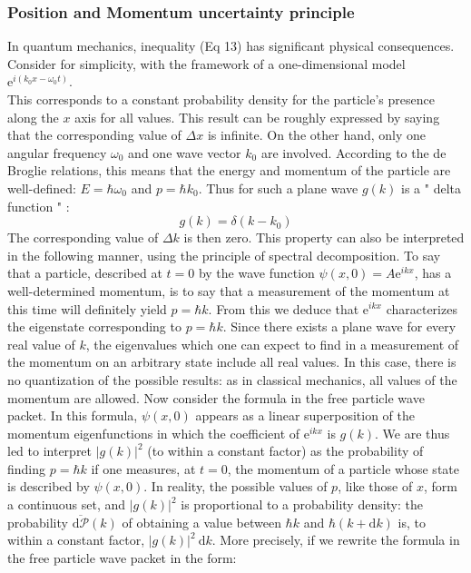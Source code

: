 \documentclass[%
 reprint,
 amsmath,amssymb,
 aps,
]{revtex4-2}
\begin{document}
\subsubsection{Position and Momentum uncertainty principle}
In quantum mechanics, inequality (Eq 13) has significant physical consequences. Consider for simplicity, with the framework of a one-dimensional model
$\mathrm{e}^{i\left(k_0 x-\omega_0 t\right)}$. \\
This corresponds to a constant probability density for the particle's presence along the $x$ axis for all values. This result can be roughly expressed by saying that the corresponding value of $\Delta x$ is infinite. On the other hand, only one angular frequency $\omega_0$ and one wave vector $k_0$ are involved. According to the de Broglie relations, this means that the energy and momentum of the particle are well-defined: $E=\hbar \omega_0$ and $p=\hbar k_0$. Thus for such a plane wave $g(k)$ is a " delta function " :
$$
g(k)=\delta\left(k-k_0\right)
$$
The corresponding value of $\Delta k$ is then zero.
This property can also be interpreted in the following manner, using the principle of spectral decomposition. To say that a particle, described at $t=0$ by the wave function $\psi(x, 0)=A \mathrm{e}^{i k x}$, has a well-determined momentum, is to say that a measurement of the momentum at this time will definitely yield $p=\hbar k$. From this we deduce that $\mathrm{e}^{i k x}$ characterizes the eigenstate corresponding to $p=\hbar k$. Since there exists a plane wave for every real value of $k$, the eigenvalues which one can expect to find in a measurement of the momentum on an arbitrary state include all real values. In this case, there is no quantization of the possible results: as in classical mechanics, all values of the momentum are allowed.
Now consider the formula in the free particle wave packet. In this formula, $\psi(x, 0)$ appears as a linear superposition of the momentum eigenfunctions in which the coefficient of $\mathrm{e}^{i k x}$ is $g(k)$. We are thus led to interpret $|g(k)|^2$ (to within a constant factor) as the probability of finding $p=\hbar k$ if one measures, at $t=0$, the momentum of a particle whose state is described by $\psi(x, 0)$. In reality, the possible values of $p$, like those of $x$, form a continuous set, and $|g(k)|^2$ is proportional to a probability density: the probability $\overline{\mathrm{d} \mathscr{P}}(k)$ of obtaining a value between $\hbar k$ and $\hbar(k+\mathrm{d} k)$ is, to within a constant factor, $|g(k)|^2 \mathrm{~d} k$. More precisely, if we rewrite the formula in the free particle wave packet  in the form:
\end{document}
